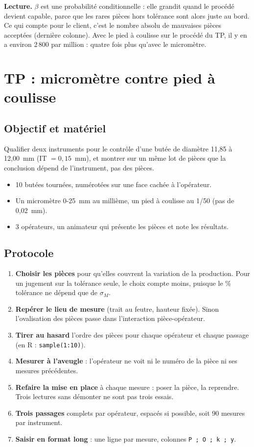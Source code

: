 \documentclass[11pt,a4paper]{article}
\theoremstyle{sj}
\theoremstyle{definition}
\theoremstyle{remark}
\begin{document}
\textbf{Lecture.} $\beta$ est une probabilité conditionnelle : elle grandit quand le procédé devient capable, parce que les rares pièces hors tolérance sont alors juste au bord. Ce qui compte pour le client, c'est le nombre absolu de mauvaises pièces acceptées (dernière colonne). Avec le pied à coulisse sur le procédé du TP, il y en a environ 2\,800 par million : quatre fois plus qu'avec le micromètre.

\section{TP : micromètre contre pied à coulisse}\label{sec:tp}

\subsection{Objectif et matériel}

Qualifier deux instruments pour le contrôle d'une butée de diamètre 11,85 à 12,00~mm (IT $=0{,}15$~mm), et montrer sur un même lot de pièces que la conclusion dépend de l'instrument, pas des pièces.
\begin{itemize}[leftmargin=1.4em]
\item 10 butées tournées, numérotées sur une face cachée à l'opérateur.
\item Un micromètre 0-25~mm au millième, un pied à coulisse au 1/50 (pas de 0,02~mm).
\item 3 opérateurs, un animateur qui présente les pièces et note les résultats.
\end{itemize}

\subsection{Protocole}

\begin{enumerate}[leftmargin=1.4em]
\item \textbf{Choisir les pièces} pour qu'elles couvrent la variation de la production. Pour un jugement sur la tolérance seule, le choix compte moins, puisque le \% tolérance ne dépend que de $\sigma_M$.
\item \textbf{Repérer le lieu de mesure} (trait au feutre, hauteur fixée). Sinon l'ovalisation des pièces passe dans l'interaction pièce-opérateur.
\item \textbf{Tirer au hasard} l'ordre des pièces pour chaque opérateur et chaque passage (en R : \texttt{sample(1:10)}).
\item \textbf{Mesurer à l'aveugle} : l'opérateur ne voit ni le numéro de la pièce ni ses mesures précédentes.
\item \textbf{Refaire la mise en place} à chaque mesure : poser la pièce, la reprendre. Trois lectures sans démonter ne sont pas trois essais.
\item \textbf{Trois passages} complets par opérateur, espacés si possible, soit 90 mesures par instrument.
\item \textbf{Saisir en format long} : une ligne par mesure, colonnes \texttt{P ; O ; k ; y}.
\end{enumerate}
\end{document}
